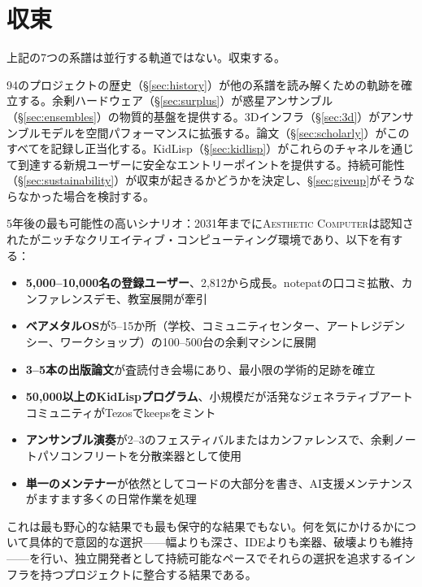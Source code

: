 \documentclass[10pt,letterpaper,twocolumn]{article}
\newcommand{\ac}{\textsc{Aesthetic Computer}}
\begin{document}

\section{収束}
\label{sec:convergence}

上記の7つの系譜は並行する軌道ではない。収束する。

94のプロジェクトの歴史（\S\ref{sec:history}）が他の系譜を読み解くための軌跡を確立する。余剰ハードウェア（\S\ref{sec:surplus}）が惑星アンサンブル（\S\ref{sec:ensembles}）の物質的基盤を提供する。3Dインフラ（\S\ref{sec:3d}）がアンサンブルモデルを空間パフォーマンスに拡張する。論文（\S\ref{sec:scholarly}）がこのすべてを記録し正当化する。KidLisp（\S\ref{sec:kidlisp}）がこれらのチャネルを通じて到達する新規ユーザーに安全なエントリーポイントを提供する。持続可能性（\S\ref{sec:sustainability}）が収束が起きるかどうかを決定し、\S\ref{sec:giveup}がそうならなかった場合を検討する。

5年後の最も可能性の高いシナリオ：2031年までに\ac{}は認知されたがニッチなクリエイティブ・コンピューティング環境であり、以下を有する：

\begin{itemize}
  \item \textbf{5,000--10,000名の登録ユーザー}、2,812から成長。notepatの口コミ拡散、カンファレンスデモ、教室展開が牽引
  \item \textbf{ベアメタルOS}が5--15か所（学校、コミュニティセンター、アートレジデンシー、ワークショップ）の100--500台の余剰マシンに展開
  \item \textbf{3--5本の出版論文}が査読付き会場にあり、最小限の学術的足跡を確立
  \item \textbf{50,000以上のKidLispプログラム}、小規模だが活発なジェネラティブアートコミュニティがTezosでkeepsをミント
  \item \textbf{アンサンブル演奏}が2--3のフェスティバルまたはカンファレンスで、余剰ノートパソコンフリートを分散楽器として使用
  \item \textbf{単一のメンテナー}が依然としてコードの大部分を書き、AI支援メンテナンスがますます多くの日常作業を処理
\end{itemize}

これは最も野心的な結果でも最も保守的な結果でもない。何を気にかけるかについて具体的で意図的な選択——幅よりも深さ、IDEよりも楽器、破壊よりも維持——を行い、独立開発者として持続可能なペースでそれらの選択を追求するインフラを持つプロジェクトに整合する結果である。

\end{document}
